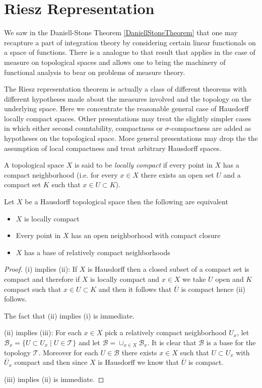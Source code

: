 \section{Riesz Representation}

We saw in the Daniell-Stone Theorem \ref{DaniellStoneTheorem} that one
may recapture a part of integration theory by considering certain
linear functionals on a space of functions.  There is a analogue to
that result that applies in the case of measure on topological
spaces and allows one to bring the machinery of functional analysis to
bear on problems of measure theory.  

The Riesz representation theorem is actually a class of different
theorems with different hypotheses made about the measures involved
and the topology on the
underlying space.  Here we concentrate the reasonable general case of
Hausdorff locally compact spaces.  Other presentations may treat the
slightly simpler cases in which either second countability,
compactness or
$\sigma$-compactness are added as hypotheses on the topological space.  More general
presentations may drop the the assumption of local compactness and treat
arbitrary Hausdorff spaces.  

\begin{defn}A topological space $X$ is said to be \emph{locally
    compact} if every point in $X$ has a compact neighborhood
  (i.e. for every $x \in X$ there exists an open set $U$ and a compact
  set $K$ such that $x \in U \subset K$).
\end{defn}

\begin{lem}\label{LocallyCompactEquivalences}Let $X$ be a Hausdorff topological space then the following
  are equivalent
\begin{itemize}
\item[(i)]$X$ is locally compact
\item[(ii)]Every point in $X$ has an open neighborhood with compact closure
\item[(iii)]$X$ has a base of relatively compact neighborhoods
\end{itemize}
\end{lem}
\begin{proof}
(i) implies (ii):  If $X$ is Hausdorff then a closed subset of a compact set is compact
and therefore if $X$ is locally compact and $x \in X$ we take $U$ open
and $K$ compact such that $x \in U \subset K$ and then it follows that
$\overline{U}$ is compact hence (ii) follows.  

The fact that (ii) implies (i) is immediate.

(ii) implies (iii): For each $x \in X$ pick a relatively compact
neighborhood $U_x$, let $\mathcal{B}_x = \{ U \subset U_x \mid U
\in \mathcal{T} \}$ and let $\mathcal{B} = \cup_{x \in X}
\mathcal{B}_x$.  It is clear that $\mathcal{B}$ is a base for the
topology $\mathcal{T}$.  Moreover for each $U
\in \mathcal{B}$ there exists $x \in X$ such that $U \subset U_x$ with
$\overline{U}_x$ compact and then since $X$ is Hausdorff we know that
$\overline{U}$ is compact.

(iii) implies (ii) is immediate.
\end{proof}

